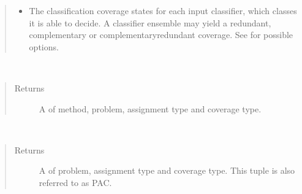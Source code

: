 \documentclass[letterpaper,10pt,english]{sphinxmanual}
\begin{document}
\begin{fulllineitems}
\begin{quote}
\begin{description}
\begin{itemize}
\item {} 
\sphinxAtStartPar
{} \textendash{} The classification coverage states for each input classifier, which classes it is able to
decide. A classifier ensemble may yield a redundant, complementary or complementary\sphinxhyphen{}redundant coverage.
See  for possible options.

\end{itemize}

\end{description}\end{quote}

\begin{fulllineitems}
\label{\detokenize{pusion.model.configuration:pusion.model.configuration.Configuration.get_tuple}}~\begin{quote}\begin{description}
\item[{Returns}] \leavevmode
\sphinxAtStartPar
A  of method, problem, assignment type and coverage type.

\end{description}\end{quote}

\end{fulllineitems}


\begin{fulllineitems}
\label{\detokenize{pusion.model.configuration:pusion.model.configuration.Configuration.get_pac}}~\begin{quote}\begin{description}
\item[{Returns}] \leavevmode
\sphinxAtStartPar
A  of problem, assignment type and coverage type. This tuple is also referred to as PAC.

\end{description}\end{quote}

\end{fulllineitems}


\end{fulllineitems}
\end{document}
